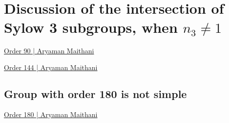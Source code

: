 \section{Discussion of the intersection of Sylow 3 subgroups, when \texorpdfstring{$n_3\neq1$}{n_3neq1}}

\href{https://aryamanmaithani.github.io/alg/groups/simple/90/}{Order 90 | Aryaman Maithani}

\href{https://aryamanmaithani.github.io/alg/groups/simple/144/}{Order 144 | Aryaman Maithani}

\subsection{Group with order 180 is not simple}

\href{https://aryamanmaithani.github.io/alg/groups/simple/180/}{Order 180 | Aryaman Maithani}

